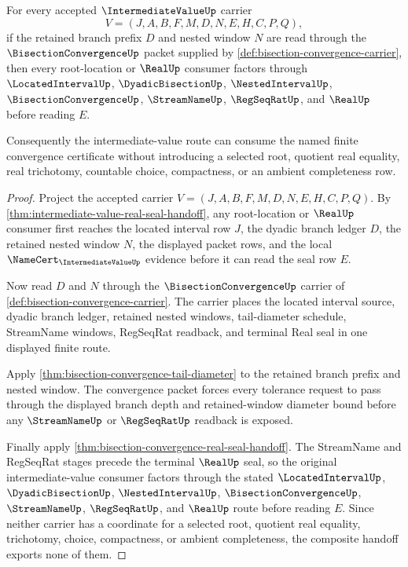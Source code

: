 \begin{theorem}
\label{thm:intermediate-value-bisection-convergence-handoff}
For every accepted $\IntermediateValueUp$ carrier
$$
V=(J,A,B,F,M,D,N,E,H,C,P,Q),
$$
if the retained branch prefix $D$ and nested window $N$ are read through the $\BisectionConvergenceUp$ packet supplied by \autoref{def:bisection-convergence-carrier}, then every root-location or $\RealUp$ consumer factors through $\LocatedIntervalUp$, $\DyadicBisectionUp$, $\NestedIntervalUp$, $\BisectionConvergenceUp$, $\StreamNameUp$, $\RegSeqRatUp$, and $\RealUp$ before reading $E$.

Consequently the intermediate-value route can consume the named finite convergence certificate without introducing a selected root, quotient real equality, real trichotomy, countable choice, compactness, or an ambient completeness row.
\end{theorem}
\begin{proof}
Project the accepted carrier $V=(J,A,B,F,M,D,N,E,H,C,P,Q)$. By \autoref{thm:intermediate-value-real-seal-handoff}, any root-location or $\RealUp$ consumer first reaches the located interval row $J$, the dyadic branch ledger $D$, the retained nested window $N$, the displayed packet rows, and the local $\NameCert_{\IntermediateValueUp}$ evidence before it can read the seal row $E$.

Now read $D$ and $N$ through the $\BisectionConvergenceUp$ carrier of \autoref{def:bisection-convergence-carrier}. The carrier places the located interval source, dyadic branch ledger, retained nested windows, tail-diameter schedule, StreamName windows, RegSeqRat readback, and terminal Real seal in one displayed finite route.

Apply \autoref{thm:bisection-convergence-tail-diameter} to the retained branch prefix and nested window. The convergence packet forces every tolerance request to pass through the displayed branch depth and retained-window diameter bound before any $\StreamNameUp$ or $\RegSeqRatUp$ readback is exposed.

Finally apply \autoref{thm:bisection-convergence-real-seal-handoff}. The StreamName and RegSeqRat stages precede the terminal $\RealUp$ seal, so the original intermediate-value consumer factors through the stated $\LocatedIntervalUp$, $\DyadicBisectionUp$, $\NestedIntervalUp$, $\BisectionConvergenceUp$, $\StreamNameUp$, $\RegSeqRatUp$, and $\RealUp$ route before reading $E$. Since neither carrier has a coordinate for a selected root, quotient real equality, trichotomy, choice, compactness, or ambient completeness, the composite handoff exports none of them.
\end{proof}

